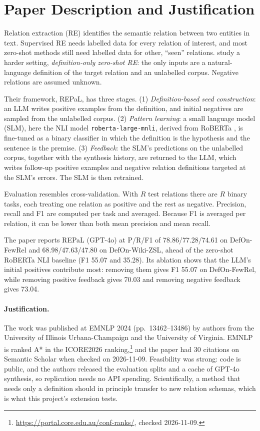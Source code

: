 \section{Paper Description and Justification}
\label{sec:paper}

Relation extraction (RE) identifies the semantic relation between two entities in text. Supervised RE needs labelled data for every relation of interest, and most zero-shot methods still need labelled data for other, ``seen'' relations. \citet{zhou2024grasping} study a harder setting, \emph{definition-only zero-shot RE}: the only inputs are a natural-language definition of the target relation and an unlabelled corpus. Negative relations are assumed unknown.

Their framework, REPaL, has three stages. (1) \emph{Definition-based seed construction}: an LLM writes positive examples from the definition, and initial negatives are sampled from the unlabelled corpus. (2) \emph{Pattern learning}: a small language model (SLM), here the NLI model \texttt{roberta-large-mnli}, derived from RoBERTa \citep{liu2019roberta}, is fine-tuned as a binary classifier in which the definition is the hypothesis and the sentence is the premise. (3) \emph{Feedback}: the SLM's predictions on the unlabelled corpus, together with the synthesis history, are returned to the LLM, which writes follow-up positive examples and negative relation definitions targeted at the SLM's errors. The SLM is then retrained.

Evaluation resembles cross-validation. With $R$ test relations there are $R$ binary tasks, each treating one relation as positive and the rest as negative. Precision, recall and F1 are computed per task and averaged. Because F1 is averaged per relation, it can be lower than both mean precision and mean recall.

The paper reports REPaL (GPT-4o) at P/R/F1 of 78.86/77.28/74.61 on DefOn-FewRel and 68.98/47.63/47.80 on DefOn-Wiki-ZSL, ahead of the zero-shot RoBERTa NLI baseline (F1 55.07 and 35.28). Its ablation shows that the LLM's initial positives contribute most: removing them gives F1 55.07 on DefOn-FewRel, while removing positive feedback gives 70.03 and removing negative feedback gives 73.04.

\paragraph{Justification.} The work was published at EMNLP 2024 (pp.\ 13462--13486) by authors from the University of Illinois Urbana-Champaign and the University of Virginia. EMNLP is ranked A* in the ICORE2026 ranking,\footnote{\url{https://portal.core.edu.au/conf-ranks/}, checked 2026-11-09.} and the paper had 30 citations on Semantic Scholar when checked on 2026-11-09. Feasibility was strong: code is public, and the authors released the evaluation splits and a cache of GPT-4o synthesis, so replication needs no API spending. Scientifically, a method that needs only a definition should in principle transfer to new relation schemas, which is what this project's extension tests.
